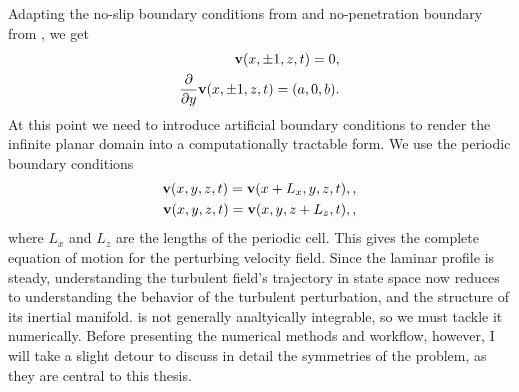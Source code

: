 Adapting the no-slip boundary conditions from  and no-penetration boundary from , we get
\begin{align}
\Vector{v}(x,\pm 1,z,t) = 0,\\
\pder{1}{}{y}\Vector{v}(x,\pm 1,z,t) = (a,0,b).
\end{align}
At this point we need to introduce artificial boundary conditions to  render the infinite planar domain into a computationally tractable form. We use the periodic boundary conditions 
\begin{align}
\mathbf{v}(x,y,z,t) = \mathbf{v}(x+L_x,y,z,t),\label{eq:periodicBCx},\\
\mathbf{v}(x,y,z,t) = \mathbf{v}(x,y,z+L_z,t),\label{eq:periodicBCz},
\end{align}
where $L_x$ and $L_z$ are the lengths of the periodic cell. This gives the complete equation of motion for the perturbing velocity field.  Since the laminar profile is steady, understanding the turbulent field's trajectory in state space now reduces to understanding the behavior of the turbulent perturbation, and the structure of its inertial manifold.  is not generally analtyically integrable, so we must tackle it numerically. Before presenting the numerical methods and workflow, however, I will take a slight detour to discuss in detail the symmetries of the \pCf problem, as they are central to this thesis. 
